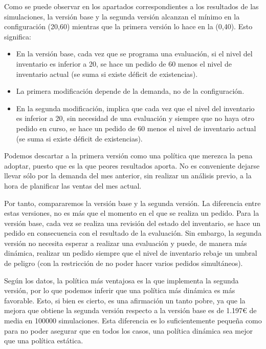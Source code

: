 Como se puede observar en los apartados correspondientes a los resultados de las simulaciones, la versión base y la segunda versión alcanzan el mínimo en la configuración (20,60) mientras que la primera versión lo hace en la (0,40).
Esto significa:
\begin{itemize}
	\item En la versión base, cada vez que se programa una evaluación, si el nivel del inventario es inferior a 20, se hace un pedido de 60 menos el nivel de inventario actual (se suma si existe déficit de existencias).
	\item La primera modificación depende de la demanda, no de la configuración.
	\item En la segunda modificación, implica que cada vez que el nivel del inventario es inferior a 20, sin necesidad de una evaluación y siempre que no haya otro pedido en curso, se hace un pedido de 60 menos el nivel de inventario actual (se suma si existe déficit de existencias).
\end{itemize}

Podemos descartar a la primera versión como una política que merezca la pena adoptar, puesto que es la que peores resultados aporta. No es conveniente dejarse llevar sólo por la demanda del mes anterior, sin realizar un análisis previo, a la hora de planificar las ventas del mes actual.

Por tanto, compararemos la versión base y la segunda versión. La diferencia entre estas versiones, no es más que el momento en el que se realiza un pedido. Para la versión base, cada vez se realiza una revisión del estado del inventario, se hace un pedido en consecuencia con el resultado de la evaluación. Sin embargo, la segunda versión no necesita esperar a realizar una evaluación y puede, de manera más dinámica, realizar un pedido siempre que el nivel de inventario rebaje un umbral de peligro (con la restricción de no poder hacer varios pedidos simultáneos).

Según los datos, la política más ventajosa es la que implementa la segunda versión, por lo que podemos inferir que una política  más dinámica es más favorable. Esto, si bien es cierto, es una afirmación un tanto pobre, ya que la mejora que obtiene la segunda versión respecto a la versión base es de 1.197€ de media en 100000 simulaciones. Esta diferencia es lo suficientemente pequeña como para no poder asegurar que en todos los casos, una política dinámica sea mejor que una política estática.
